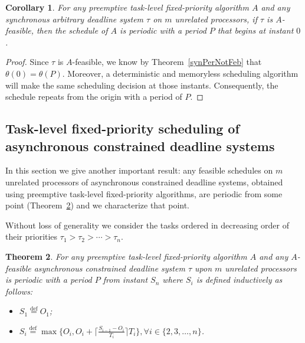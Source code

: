 \documentclass[a4paper,11pt]{article}
\newtheorem{Theorem}{Theorem}
\newtheorem{Corollary}[Theorem]{Corollary}
\newcommand{\equals}{\stackrel{\mathrm{def}}{=}}
\begin{document}
\begin{Corollary}\label{synPerArbi}
For any preemptive task-level fixed-priority algorithm $A$ and any synchronous
arbitrary deadline system $\tau$ on $m$ unrelated processors, if $\tau$ is $A$-feasible, then the schedule of $A$ is periodic with a period $P$ that begins at instant $0$.
\end{Corollary}

\begin{proof}
Since $\tau$ is $A$-feasible, we know by Theorem~\ref{synPerNotFeb} that $\theta(0)=\theta(P)$. Moreover, a deterministic and memoryless scheduling algorithm will make the same scheduling decision at those instants. Consequently, the schedule repeats from the origin with a period of $P$.
\end{proof}

\subsection{Task-level fixed-priority scheduling of asynchronous constrained
  deadline systems} \label{asynSect}

In this section we give another important result: any feasible schedules on $m$ unrelated processors of asynchronous constrained deadline systems,
obtained using preemptive task-level fixed-priority algorithms, are periodic from some point (Theorem~\ref{asynPer}) and we characterize that point.

Without loss of generality we consider the tasks ordered in decreasing
order of their priorities $\tau_1 > \tau_2 > \cdots > \tau_n$.


\begin{Theorem} \label{asynPer} For any preemptive task-level fixed-priority
algorithm $A$ and any $A$-feasible asynchronous constrained deadline system $\tau$ upon $m$ unrelated processors is periodic with a period $P$ from instant $S_n$ where $S_i$ is defined inductively as follows:

  \begin{itemize}
  \item $S_1 \equals O_1$; 
  \item $S_i \equals \max \{ O_i, O_i+ \lceil \frac{S_{i-1}-O_i}{T_i}
    \rceil T_i \}, \forall i \in \{2,3, \ldots, n \}$.
  \end{itemize}
\end{Theorem}
\end{document}
